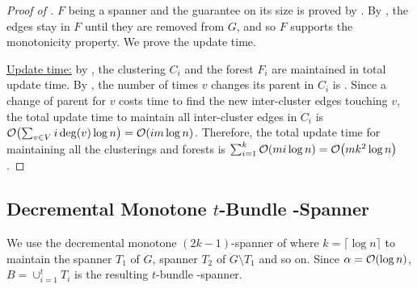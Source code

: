 \begin{proof}[Proof of ]
\( F \) being a spanner and the guarantee on its size is proved by .
By , the edges stay in \( F \) until they are removed from \( G \), and so \( F \) supports the monotonicity property.
We prove the update time.


\underline{Update time:}
by , the clustering \( C_i \) and the forest \( F_i \) are maintained in  total update time.
By , the number of times \( v \) changes its parent in \( C_i \) is .
Since a change of parent for \( v \) costs  time to find the new inter-cluster  edges touching \( v \), the total update time to maintain all inter-cluster edges in \( C_i \) is \( \atmost{\sum _{v \in V} i \deg(v) \log n} = \atmost{i m \log n} \).
Therefore, the total update time for maintaining all the clusterings and forests is \( \sum_{i = 1} ^ k \atmost{m i \log n} = \atmost{m k^2 \log n} \)
.
\end{proof}




\subsection{Decremental Monotone \( t \)-Bundle -Spanner} \label{subsec:app_tbundle}

We use the decremental monotone \( (2k -1) \)-spanner of 
 where \( k = \lceil \log n \rceil \) to maintain the spanner \( T_1 \) of \( G \), spanner \( T_2 \) of \( G \setminus T_1 \) and so on.
Since \( \alpha = \atmost{\log n} \), \( B = \cup_{i = 1} ^t T_i \) is the resulting \( t \)-bundle -spanner.




















